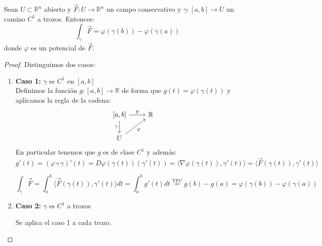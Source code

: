 \begin{proposición}
Sean $U \subset \mathbb{R}^n$ abierto y $\vec{F}: U \to \mathbb{R}^n$ un campo conservativo y $\gamma: [a,b] \to U$ un camino $C^1$ a trozos. Entonces:
$$\int_{\gamma} \vec{F} = \varphi(\gamma(b)) - \varphi(\gamma(a))$$
donde $\varphi$ es un potencial de $\vec{F}$.
\end{proposición}

\begin{proof}
    Distinguimos dos casos:
    \begin{enumerate}
        \item \textbf{Caso 1:} $\gamma$ es $C^1$ en $[a,b]$\\
              Definimos la función $g: [a,b] \to \mathbb{R}$ de forma que $g(t) = \varphi(\gamma(t))$ y aplicamos la regla de la cadena:
              \[
                  \begin{tikzcd}
                      {[a,b]} \arrow[d, "\gamma"'] \arrow[r, "g"] & \mathbb{R} \\
                      U \arrow[ru, "\varphi"']
                  \end{tikzcd}
              \]
              En particular tenemos que $g$ es de clase $C^1$ y además:
              \[
                  g'(t) = (\varphi \circ \gamma)'(t) = D\varphi (\gamma(t)) (\gamma'(t)) = \langle \nabla \varphi (\gamma(t)), \gamma'(t) \rangle = \langle \vec{F}(\gamma(t)), \gamma'(t) \rangle
              \]

              \[
                  \int_{\gamma} \vec{F} = \int_{a}^{b} \langle \vec{F} (\gamma(t)), \gamma'(t) \rangle dt = \int_{a}^{b} g'(t) dt \overset{\text{TFC}}{=} g(b) - g(a) = \varphi (\gamma(b)) - \varphi (\gamma(a))
              \]

        \item \textbf{Caso 2:} \(\gamma\) es \(C^1\) a trozos

              Se aplica el caso 1 a cada trozo.
    \end{enumerate}
\end{proof}

